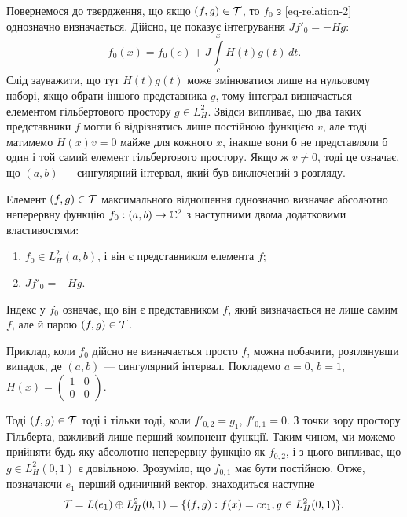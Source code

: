 Повернемося до твердження, що якщо $(f,g)\in\mathcal{T}$, то $f_0$ з \eqref{eq-relation-2} однозначно визначається. Дійсно, це показує інтегрування $Jf'_0=-Hg$: 
\begin{equation}
	f_0(x)=f_0(c) + J\int\limits_c^x H(t)g(t)\,dt.
\end{equation}
Слід зауважити, що тут $H(t)g(t)$ може змінюватися лише на нульовому наборі, якщо обрати іншого представника $g$, тому інтеграл визначається елементом гільбертового простору $g\in L^2_H$. Звідси випливає, що два таких представники $f$ могли б відрізнятись лише постійною функцією $v$, але тоді матимемо $H(x)v=0$ майже для кожного $x$, інакше вони б не представляли б один і той самий елемент гільбертового простору. Якщо ж $v\ne0$, тоді це означає, що $(a,b)$ --- сингулярний інтервал, який був виключений з розгляду.

\begin{lemma} \label{lemma-1-relations}
	Елемент $(f,g)\in\mathcal{T}$ максимального відношення однозначно визначає абсолютно неперервну функцію $f_0:(a,b)\to\mathbb{C}^2$ з наступними двома додатковими властивостями: 
	\begin{enumerate}
		\item $f_0\in L^2_H(a,b)$, і він є представником елемента $f$;
		\item $Jf'_0=-Hg$.
	\end{enumerate}
\end{lemma}

Індекс у $f_0$ означає, що він є представником $f$, який визначається не лише самим $f$, але й парою $(f,g)\in\mathcal{T}$.

Приклад, коли $f_0$ дійсно не визначається просто $f$, можна побачити, розглянувши випадок, де $(a,b)$ --- сингулярний інтервал. Покладемо $a=0$, $b = 1$, 
$H(x) =
\begin{pmatrix}
	1 & 0 \\ 0 & 0
\end{pmatrix}
$.

Тоді $(f,g)\in\mathcal{T}$ тоді і тільки тоді, коли $f'_{0,2}=g_1$, $f'_{0,1}=0$. З точки зору простору Гільберта, важливий лише перший компонент функції. Таким чином, ми можемо прийняти будь-яку абсолютно неперервну функцію як $f_{0,2}$, і з цього випливає, що $g\in L^2_H(0,1)$ є довільною. Зрозуміло, що $f_{0,1}$ має бути постійною. Отже, позначаючи $e_1$ перший одиничний вектор, знаходиться наступне
\begin{equation}
	\mathcal{T} = L(e_1)\oplus L^2_H(0,1) =\{(f,g): f(x) = ce_1, g\in L^2_H(0,1)\}. 
\end{equation}

